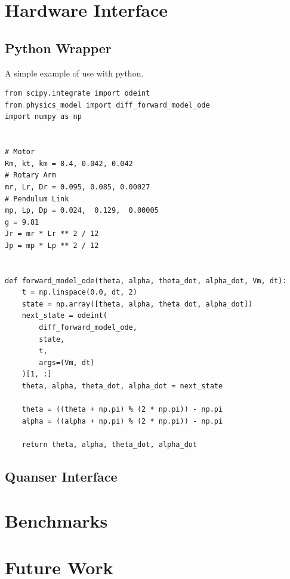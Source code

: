 \section{Hardware Interface}

\subsection{Python Wrapper}

\lipsum[22]


A simple example of use with python.

\begin{verbatim}
from scipy.integrate import odeint
from physics_model import diff_forward_model_ode
import numpy as np


# Motor
Rm, kt, km = 8.4, 0.042, 0.042
# Rotary Arm
mr, Lr, Dr = 0.095, 0.085, 0.00027
# Pendulum Link
mp, Lp, Dp = 0.024,  0.129,  0.00005
g = 9.81
Jr = mr * Lr ** 2 / 12
Jp = mp * Lp ** 2 / 12


def forward_model_ode(theta, alpha, theta_dot, alpha_dot, Vm, dt):
    t = np.linspace(0.0, dt, 2)
    state = np.array([theta, alpha, theta_dot, alpha_dot])
    next_state = odeint(
        diff_forward_model_ode,
        state,
        t,
        args=(Vm, dt)
    )[1, :]
    theta, alpha, theta_dot, alpha_dot = next_state

    theta = ((theta + np.pi) % (2 * np.pi)) - np.pi
    alpha = ((alpha + np.pi) % (2 * np.pi)) - np.pi

    return theta, alpha, theta_dot, alpha_dot
\end{verbatim}


\lipsum[39]

\subsection{Quanser Interface}
\lipsum[69]

\section{Benchmarks}
\lipsum[99]

\section{Future Work}
\lipsum[2-3]


